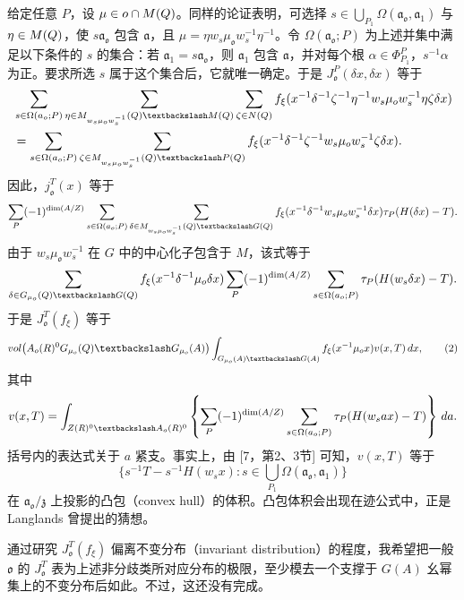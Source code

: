 给定任意 $P$，设 $\mu\in o\cap M(Q)$。同样的论证表明，可选择
$s\in\bigcup_{P_1}\Omega(\mathfrak a_\mathfrak o,\mathfrak a_1)$ 与 $\eta\in M(Q)$，使
$s\mathfrak a_\mathfrak o$ 包含 $\mathfrak a$，且
$\mu=\eta w_s\mu_\mathfrak ow_s^{-1}\eta^{-1}$。令
$\Omega(\mathfrak a_\mathfrak o;P)$ 为上述并集中满足以下条件的 $s$ 的集合：若
$\mathfrak a_1=s\mathfrak a_\mathfrak o$，则 $\mathfrak a_1$ 包含 $\mathfrak a$，并对每个根
$\alpha\in\Phi_{P_1}^P$，$s^{-1}\alpha$ 为正。要求所选 $s$ 属于这个集合后，它就唯一确定。于是 $J_\mathfrak o^P(\delta x,\delta x)$ 等于
\[
\begin{aligned}
 &\sum_{s\in\Omega(\mathfrak a_\mathfrak o;P)}
 \sum_{\eta\in M_{w_s\mu_\mathfrak ow_s^{-1}}(\Q)\backslash M(\Q)}
 \sum_{\zeta\in N(\Q)}
 f_\xi(x^{-1}\delta^{-1}\zeta^{-1}\eta^{-1}w_s\mu_\mathfrak ow_s^{-1}\eta\zeta\delta x)\\
 &=\sum_{s\in\Omega(\mathfrak a_\mathfrak o;P)}
 \sum_{\zeta\in M_{w_s\mu_\mathfrak ow_s^{-1}}(\Q)\backslash P(\Q)}
 f_\xi(x^{-1}\delta^{-1}\zeta^{-1}w_s\mu_\mathfrak ow_s^{-1}\zeta\delta x).
\end{aligned}
\]
因此，$j_\mathfrak o^T(x)$ 等于
\[
 \sum_P(-1)^{\dim(A/Z)}\sum_{s\in\Omega(\mathfrak a_\mathfrak o;P)}
 \sum_{\delta\in M_{w_s\mu_\mathfrak ow_s^{-1}}(\Q)\backslash G(\Q)}
 f_\xi(x^{-1}\delta^{-1}w_s\mu_\mathfrak ow_s^{-1}\delta x)
 \widehat\tau_P(H(\delta x)-T).
\]
由于 $w_s\mu_\mathfrak ow_s^{-1}$ 在 $G$ 中的中心化子包含于 $M$，该式等于
\[
 \sum_{\delta\in G_{\mu_\mathfrak o}(\Q)\backslash G(\Q)}
 f_\xi(x^{-1}\delta^{-1}\mu_\mathfrak o\delta x)
 \sum_P(-1)^{\dim(A/Z)}\sum_{s\in\Omega(\mathfrak a_\mathfrak o;P)}
 \widehat\tau_P(H(w_s\delta x)-T).
\]
于是 $J_\mathfrak o^T(f_\xi)$ 等于
\begin{equation}
 \operatorname{vol}\bigl(A_\mathfrak o(\R)^0G_{\mu_\mathfrak o}(\Q)
 \backslash G_{\mu_\mathfrak o}(A)\bigr)
 \int_{G_{\mu_\mathfrak o}(A)\backslash G(A)}
 f_\xi(x^{-1}\mu_\mathfrak ox)v(x,T)\,dx,\tag{2}
\end{equation}
其中
\[
 v(x,T)=\int_{Z(\R)^0\backslash A_\mathfrak o(\R)^0}
 \left\{\sum_P(-1)^{\dim(A/Z)}\sum_{s\in\Omega(\mathfrak a_\mathfrak o;P)}
 \widehat\tau_P(H(w_sax)-T)\right\}\,da.
\]
括号内的表达式关于 $a$ 紧支。事实上，由 [7，第2、3节] 可知，$v(x,T)$ 等于
\[
 \{s^{-1}T-s^{-1}H(w_sx):s\in\bigcup_{P_1}\Omega(\mathfrak a_\mathfrak o,\mathfrak a_1)\}
\]
在 $\mathfrak a_\mathfrak o/\mathfrak z$ 上投影的凸包（convex hull）的体积。凸包体积会出现在迹公式中，正是 Langlands 曾提出的猜想。

通过研究 $J_\mathfrak o^T(f_\xi)$ 偏离不变分布（invariant distribution）的程度，我希望把一般 $\mathfrak o$ 的 $J_\mathfrak o^T$ 表为上述非分歧类所对应分布的极限，至少模去一个支撑于 $G(A)$ 幺幂集上的不变分布后如此。不过，这还没有完成。

